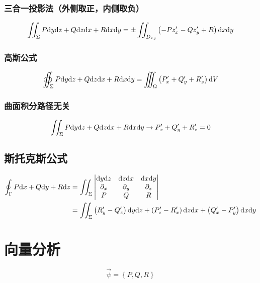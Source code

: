 \documentclass{article}
\begin{document}
\subsubsection{三合一投影法（外侧取正，内侧取负）}

\[\iint_\Sigma P\mathrm d y\mathrm d z+Q\mathrm d z\mathrm d x+R\mathrm d x\mathrm d y=
    \pm\iint_{D_{xy}}
    \left(-Pz_x^\prime-Qz_y^\prime+R\right)
    \mathrm d x\mathrm d y\]

\subsubsection{高斯公式}

\[\oiint_\Sigma P\mathrm d y\mathrm d z+Q\mathrm d z\mathrm d x+R\mathrm d x\mathrm d y=
    \iiint_\Omega\left(P_x^\prime+Q_y^\prime+R_z^\prime\right)\mathrm d V\]

\subsubsection{曲面积分路径无关}

\[\iint_\Sigma P\mathrm d y\mathrm d z+Q\mathrm d z\mathrm d x+R\mathrm d x\mathrm d y
    \to P_x^\prime+Q_y^\prime+R_z^\prime=0\]

\subsection{斯托克斯公式}

\[\begin{aligned}
        \oint_\Gamma P\mathrm d x+Q\mathrm d y+R\mathrm d z
         & =\iint_\Sigma\begin{vmatrix}
                            \mathrm d y\mathrm d z   & \mathrm d z\mathrm d x   & \mathrm d x\mathrm d y   \\
                            \partial_x & \partial_y & \partial_z \\
                            P          & Q          & R
                        \end{vmatrix} \\
         & =\iint_\Sigma
        \left(R_y^\prime-Q_z^\prime\right)\mathrm d y\mathrm d z+
        \left(P_z^\prime-R_x^\prime\right)\mathrm d z\mathrm d x+
        \left(Q_x^\prime-P_y^\prime\right)\mathrm d x\mathrm d y
    \end{aligned}\]

\section{向量分析}

\begin{definition}[向量场]
    \[\vec\psi=\left\{P,Q,R\right\}\]
\end{definition}
\end{document}
